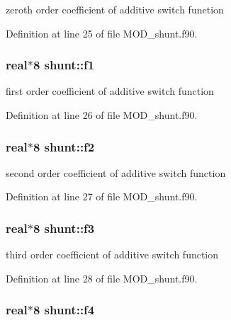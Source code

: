 zeroth order coefficient of additive switch function 



Definition at line 25 of file M\-O\-D\-\_\-shunt.\-f90.

\hypertarget{classshunt_a7f8f77ed7dcca9e92816b77eb9268045}{
\subsubsection[{f1}]{\setlength{\rightskip}{0pt plus 5cm}real$\ast$8 shunt\-::f1}}\label{classshunt_a7f8f77ed7dcca9e92816b77eb9268045}


first order coefficient of additive switch function 



Definition at line 26 of file M\-O\-D\-\_\-shunt.\-f90.

\hypertarget{classshunt_af183f88df860d77867c52354f0de006b}{
\subsubsection[{f2}]{\setlength{\rightskip}{0pt plus 5cm}real$\ast$8 shunt\-::f2}}\label{classshunt_af183f88df860d77867c52354f0de006b}


second order coefficient of additive switch function 



Definition at line 27 of file M\-O\-D\-\_\-shunt.\-f90.

\hypertarget{classshunt_a945be9c9b02dda1e684732dc3d84c607}{
\subsubsection[{f3}]{\setlength{\rightskip}{0pt plus 5cm}real$\ast$8 shunt\-::f3}}\label{classshunt_a945be9c9b02dda1e684732dc3d84c607}


third order coefficient of additive switch function 



Definition at line 28 of file M\-O\-D\-\_\-shunt.\-f90.

\hypertarget{classshunt_a5e1a57e8ec4ef13db9bfe4c4111aba5e}{
\subsubsection[{f4}]{\setlength{\rightskip}{0pt plus 5cm}real$\ast$8 shunt\-::f4}}\label{classshunt_a5e1a57e8ec4ef13db9bfe4c4111aba5e}


